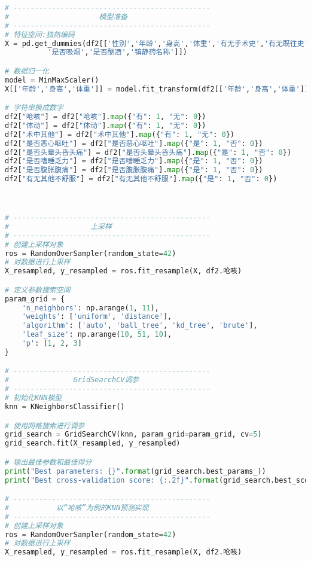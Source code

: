 \begin{lstlisting}[language=Python]
# ----------------------------------------------
#                     模型准备
# ----------------------------------------------
# 特征空间:独热编码
X = pd.get_dummies(df2[['性别','年龄','身高','体重','有无手术史','有无既往史',
          '是否吸烟','是否酗酒','镇静药名称']])

# 数据归一化
model = MinMaxScaler()
X[['年龄','身高','体重']] = model.fit_transform(df2[['年龄','身高','体重']])

# 字符串换成数字
df2["呛咳"] = df2["呛咳"].map({"有": 1, "无": 0})
df2["体动"] = df2["体动"].map({"有": 1, "无": 0})
df2["术中其他"] = df2["术中其他"].map({"有": 1, "无": 0})
df2["是否恶心呕吐"] = df2["是否恶心呕吐"].map({"是": 1, "否": 0})
df2["是否头晕头昏头痛"] = df2["是否头晕头昏头痛"].map({"是": 1, "否": 0})
df2["是否嗜睡乏力"] = df2["是否嗜睡乏力"].map({"是": 1, "否": 0})
df2["是否腹胀腹痛"] = df2["是否腹胀腹痛"].map({"是": 1, "否": 0})
df2["有无其他不舒服"] = df2["有无其他不舒服"].map({"是": 1, "否": 0})



# ----------------------------------------------
#                   上采样
# ----------------------------------------------
# 创建上采样对象
ros = RandomOverSampler(random_state=42)
# 对数据进行上采样
X_resampled, y_resampled = ros.fit_resample(X, df2.呛咳)

# 定义参数搜索空间
param_grid = {
    'n_neighbors': np.arange(1, 11),
    'weights': ['uniform', 'distance'],
    'algorithm': ['auto', 'ball_tree', 'kd_tree', 'brute'],
    'leaf_size': np.arange(10, 51, 10),
    'p': [1, 2, 3]
}

# ----------------------------------------------
#               GridSearchCV调参
# ----------------------------------------------
# 初始化KNN模型
knn = KNeighborsClassifier()

# 使用网格搜索进行调参
grid_search = GridSearchCV(knn, param_grid=param_grid, cv=5)
grid_search.fit(X_resampled, y_resampled)

# 输出最佳参数和最佳得分
print("Best parameters: {}".format(grid_search.best_params_))
print("Best cross-validation score: {:.2f}".format(grid_search.best_score_))

# ----------------------------------------------
#           以“呛咳”为例的KNN预测实现
# ----------------------------------------------
# 创建上采样对象
ros = RandomOverSampler(random_state=42)
# 对数据进行上采样
X_resampled, y_resampled = ros.fit_resample(X, df2.呛咳)


\end{lstlisting}
